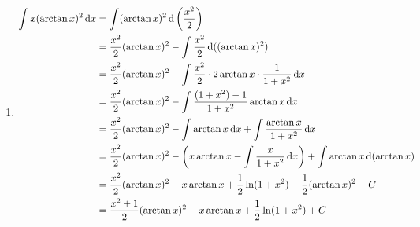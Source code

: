 \begin{solution}
\begin{enumerate}
        \item %
              \begin{align*}
                  \int x (\arctan x)^2 \operatorname{d\!} x & = \int (\arctan x)^2 \operatorname{d}\left(\frac{x^2}{2}\right)                                                                       \\
                                              & = \frac{x^2}{2} (\arctan x)^2 - \int \frac{x^2}{2} \operatorname{d}((\arctan x)^2)                                                    \\
                                              & = \frac{x^2}{2} (\arctan x)^2 - \int \frac{x^2}{2} \cdot 2 \arctan x \cdot \frac{1}{1+x^2} \operatorname{d\!} x                          \\
                                              & = \frac{x^2}{2} (\arctan x)^2 - \int \frac{(1+x^2) - 1}{1+x^2} \arctan x \operatorname{d\!} x                                            \\
                                              & = \frac{x^2}{2} (\arctan x)^2 - \int \arctan x \operatorname{d\!} x + \int \frac{\arctan x}{1+x^2} \operatorname{d\!} x                                \\
                                              & = \frac{x^2}{2} (\arctan x)^2 - \left( x \arctan x - \int \frac{x}{1+x^2} \operatorname{d\!} x \right) + \int \arctan x \operatorname{d}(\arctan x) \\
                                              & = \frac{x^2}{2} (\arctan x)^2 - x \arctan x + \frac{1}{2} \ln(1+x^2) + \frac{1}{2}(\arctan x)^2 + C                        \\
                                              & = \frac{x^2 + 1}{2} (\arctan x)^2 - x \arctan x + \frac{1}{2} \ln(1+x^2) + C
              \end{align*}


\end{enumerate}
\end{solution}
